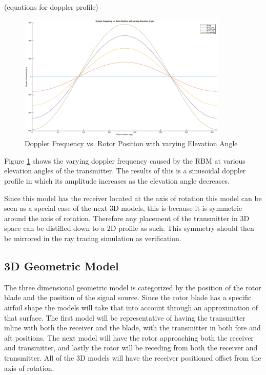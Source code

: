 (equations for doppler profile)

\begin{figure}
	\begin{center}
		\includegraphics[width=10cm]{images/background/2d_theoretical_doppler_profile.eps}
		\caption{Doppler Frequency vs. Rotor Position with varying Elevation Angle}
		\label{fig:2D_theoretical_doppler}
	\end{center}
\end{figure}

Figure \ref{fig:2D_theoretical_doppler} shows the varying doppler frequency caused by the RBM at various elevation angles of the transmitter. The results of this is a sinusoidal doppler profile in which its amplitude increases as the elevation angle decreases. 

Since this model has the receiver located at the axis of rotation this model can be seen as a special case of the next 3D models, this is because it is symmetric around the axis of rotation. Therefore any placement of the transmitter in 3D space can be distilled down to a 2D profile as such. This symmetry should then be mirrored in the ray tracing simulation as verification.

\subsection{3D Geometric Model}
The three dimensional geometric model is categorized by the position of the rotor blade and the position of the signal source. Since the rotor blade has a specific airfoil shape the models will take that into account through an approximation of that surface. The first model will be representative of having the transmitter inline with both the receiver and the blade, with the transmitter in both fore and aft positions. The next model will have the rotor approaching both the receiver and transmitter, and lastly the rotor will be receding from both the receiver and transmitter. All of the 3D models will have the receiver positioned offset from the axis of rotation.

